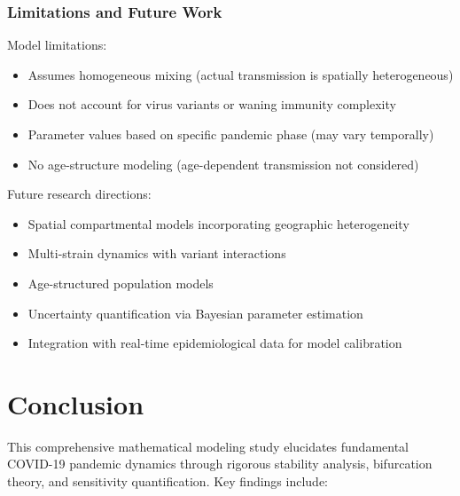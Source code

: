 \documentclass[12pt,a4paper]{report}
\begin{document}
\subsection{Limitations and Future Work}

Model limitations:
\begin{itemize}
    \item Assumes homogeneous mixing (actual transmission is spatially heterogeneous)
    \item Does not account for virus variants or waning immunity complexity
    \item Parameter values based on specific pandemic phase (may vary temporally)
    \item No age-structure modeling (age-dependent transmission not considered)
\end{itemize}

Future research directions:
\begin{itemize}
    \item Spatial compartmental models incorporating geographic heterogeneity
    \item Multi-strain dynamics with variant interactions
    \item Age-structured population models
    \item Uncertainty quantification via Bayesian parameter estimation
    \item Integration with real-time epidemiological data for model calibration
\end{itemize}

\chapter{Conclusion}

This comprehensive mathematical modeling study elucidates fundamental COVID-19 pandemic dynamics through rigorous stability analysis, bifurcation theory, and sensitivity quantification. Key findings include:
\end{document}
